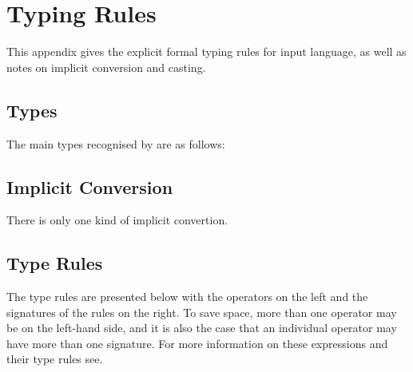 
\chapter{Typing Rules}
This appendix gives the explicit formal typing rules for 
input language, as well as notes on implicit conversion and casting.



\section{Types}

The main types recognised by  are as follows:

 
\section{Implicit Conversion}
There is only one kind of implicit convertion. 


\section{Type Rules}
The type rules are presented below with the operators on the left and
the signatures of the rules on the right. To save space, more than one
operator may be on the left-hand side, and it is also the case that an
individual operator may have more than one signature. For more information
on these expressions and their type rules see.

\vspace{0.3in}


